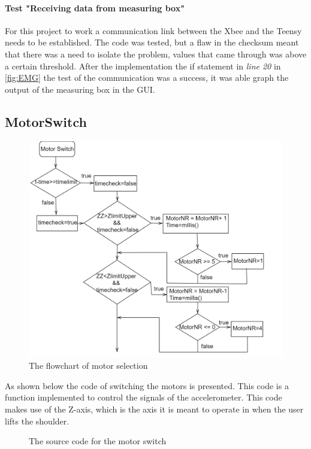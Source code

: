 \paragraph{Test "Receiving data from measuring box"}
For this project to work a communication link between the Xbee and the Teensy needs to be established. The code was tested, but a flaw in the checksum meant that there was a need to isolate the problem, values that came through was above a certain threshold. After the implementation the if statement in \textit{line 20} in \ref{fig:EMG} the test of the communication was a success, it was able graph the output of the measuring box in the GUI.

\subsection*{MotorSwitch}\label{MotorSwitchCode}
\begin{figure}[H]
    \centering
    \includegraphics[width=\textwidth]{Figures/Technical_figures/motorselect.png}
    \caption{The flowchart of motor selection}
    \label{fig:motorsele}
\end{figure}
As shown below the code of switching the motors is presented. This code is a function implemented to control the signals of the accelerometer. This code makes use of the Z-axis, which is the axis it is meant to operate in when the user lifts the shoulder.\\

\begin{figure}[H]
    \centering

    \caption{The source code for the motor switch}
    \label{fig:motorSel}
\end{figure}
\noindent
